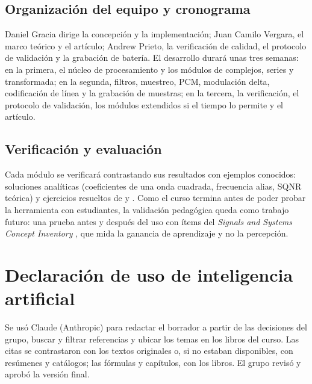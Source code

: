 \documentclass[conference]{IEEEtran}
\begin{document}
\subsection{Organización del equipo y cronograma}
Daniel Gracia dirige la concepción y la implementación; Juan Camilo Vergara, el marco teórico y el artículo; Andrew Prieto, la verificación de calidad, el protocolo de validación y la grabación de batería. El desarrollo durará unas tres semanas: en la primera, el núcleo de procesamiento y los módulos de complejos, series y transformada; en la segunda, filtros, muestreo, PCM, modulación delta, codificación de línea y la grabación de muestras; en la tercera, la verificación, el protocolo de validación, los módulos extendidos si el tiempo lo permite y el artículo.

\subsection{Verificación y evaluación}
Cada módulo se verificará contrastando sus resultados con ejemplos conocidos: soluciones analíticas (coeficientes de una onda cuadrada, frecuencia alias, SQNR teórica) y ejercicios resueltos de \citet{hsu2003} y \citet{lathi2019}. Como el curso termina antes de poder probar la herramienta con estudiantes, la validación pedagógica queda como trabajo futuro: una prueba antes y después del uso con ítems del \emph{Signals and Systems Concept Inventory} \citep{wage2005}, que mida la ganancia de aprendizaje y no la percepción.

\section*{Declaración de uso de inteligencia artificial}
Se usó Claude (Anthropic) para redactar el borrador a partir de las decisiones del grupo, buscar y filtrar referencias y ubicar los temas en los libros del curso. Las citas se contrastaron con los textos originales o, si no estaban disponibles, con resúmenes y catálogos; las fórmulas y capítulos, con los libros. El grupo revisó y aprobó la versión final.
\end{document}
